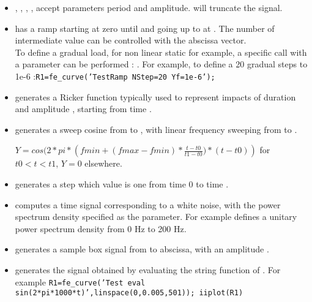 \begin{itemize}
\item {}, ,  ,  , accept parameters  period and  amplitude.  will truncate the signal. 

\item {} has a ramp starting at zero until  and going up to  at . The number of intermediate value can be controlled with the abscissa vector.\\
To define a gradual load, for non linear static for example, a specific call with a  parameter can be performed : . For example, to define a 20 gradual steps to 1e-6 :{\tt R1=fe\_curve('TestRamp NStep=20 Yf=1e-6');}

\item {} generates a Ricker function typically used to represent impacts of duration  and amplitude , starting from time .

\item {} generates a sweep cosine from  to , with linear frequency sweeping from  to .

$Y=cos(2*pi*\left(fmin+\left(fmax-fmin\right)*\frac{t-t0}{t1-t0})*\left(t-t0\right)\right)$ for $t0<t<t1$, $Y=0$ elsewhere.


\item {} generates a step which value is one from time 0 to time .

\item {} computes a time signal corresponding to a white noise, with the power spectrum density specified as the  parameter. For example  defines a unitary power spectrum density from 0 Hz to 200 Hz.

\item {} generates a sample box signal from  to  abscissa, with an amplitude .

\item {} generates the signal obtained by evaluating the string  function of . For example {\tt R1=fe\_curve('Test eval sin(2*pi*1000*t)',linspace(0,0.005,501)); iiplot(R1)}


\end{itemize}

